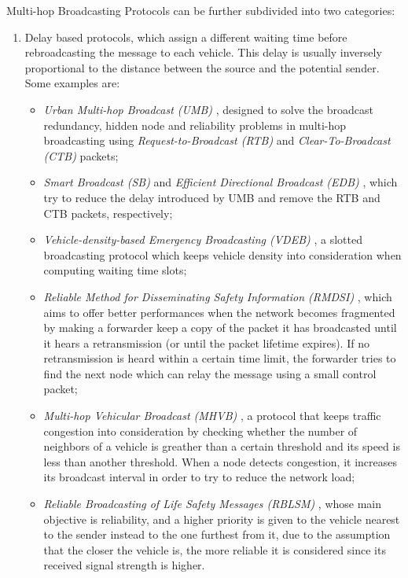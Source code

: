 		
		Multi-hop Broadcasting Protocols can be further subdivided into two categories:
		\begin{enumerate}
			\item Delay based protocols, which assign a different waiting time before rebroadcasting the message to each vehicle. This delay is usually inversely proportional to the distance between the source and the potential sender.
			Some examples are:
			\begin{itemize}
				\renewcommand\labelitemi{--}
				\item \textit{Urban Multi-hop Broadcast (UMB)} \cite{Korkmaz:2004:UMB:1023875.1023887}, designed to solve the broadcast redundancy, hidden node and reliability problems in multi-hop broadcasting using \textit{Request-to-Broadcast (RTB)} and \textit{Clear-To-Broadcast (CTB)} packets; 
				\item \textit{Smart Broadcast (SB)} \cite{4025102} and \textit{Efficient Directional Broadcast (EDB)} \cite{4340158}, which try to reduce the delay introduced by UMB and remove the RTB and CTB packets, respectively;
				\item \textit{Vehicle-density-based Emergency Broadcasting (VDEB)} \cite{5663803}, a slotted broadcasting protocol which keeps vehicle density into consideration when computing waiting time slots;
				\item \textit{Reliable Method for Disseminating Safety Information
				(RMDSI)} \cite{4591259}, which aims to offer better performances when the network becomes fragmented by making a forwarder keep a copy of the packet it has broadcasted until it hears a retransmission (or until the packet lifetime expires). If no retransmission is heard within a certain time limit, the forwarder tries to find the next node which can relay the message using a small control packet;
				\item \textit{Multi-hop Vehicular Broadcast (MHVB)} \cite{4068699}, a protocol that keeps traffic congestion into consideration by   checking whether the number of neighbors of a vehicle is greather than a certain threshold and its speed is less than another threshold. When a node detects congestion, it increases its broadcast interval in order to try to reduce the network load;
				\item \textit{Reliable Broadcasting of Life Safety Messages (RBLSM)} \cite{4458046}, whose main objective is reliability, and a higher priority is given to the vehicle nearest to the sender instead to the one furthest from it, due to the assumption that the closer the vehicle is, the more reliable it is considered since its received signal strength is higher.
			\end{itemize}
		

\end{enumerate}
